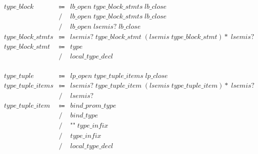 \begin{align*}
    \begin{array}{rcll}
        \mathit{type\_block}
        &\Coloneq &\mathit{lb\_open}\; \mathit{type\_block\_stmts}\; \mathit{lb\_close} \\
        &\mathrel{/} &\mathit{lb\_open}\; \mathit{type\_block\_stmts}\; \mathit{lb\_close} \\
        &\mathrel{/} &\mathit{lb\_open}\; \mathit{lsemis}{?}\; \mathit{lb\_close} \\
        \mathit{type\_block\_stmts}
        &\Coloneq &\mathit{lsemis}{?}\; \mathit{type\_block\_stmt}\; (\mathit{lsemis}\; \mathit{type\_block\_stmt}){*}\; \mathit{lsemis}{?} \\
        \mathit{type\_block\_stmt}
        &\Coloneq &\mathit{type} \\
        &\mathrel{/} &\mathit{local\_type\_decl}
    \end{array}
\end{align*}

\begin{align*}
    \begin{array}{rcll}
        \mathit{type\_tuple}
        &\Coloneq &\mathit{lp\_open}\; \mathit{type\_tuple\_items}\; \mathit{lp\_close} \\
        \mathit{type\_tuple\_items}
        &\Coloneq &\mathit{lsemis}{?}\; \mathit{type\_tuple\_item}\; (\mathit{lsemis}\; \mathit{type\_tuple\_item}){*}\; \mathit{lsemis}{?} \\
        &\mathrel{/} &\mathit{lsemis}{?} \\
        \mathit{type\_tuple\_item}
        &\Coloneq &\mathit{bind\_prom\_type} \\
        &\mathrel{/} &\mathit{bind\_type} \\
        &\mathrel{/} &\texttt{"\^{}"}\; \mathit{type\_infix} \\
        &\mathrel{/} &\mathit{type\_infix} \\
        &\mathrel{/} &\mathit{local\_type\_decl}
    \end{array}
\end{align*}

